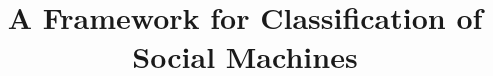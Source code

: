 \documentclass{sig-alternate}
\begin{document}
%

\title{A Framework for Classification of Social Machines}
%
%
%
%
%
\end{document}
